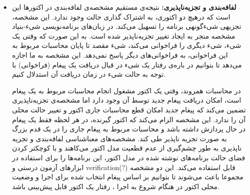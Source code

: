 \begin{itemize}
\item \textbf{لفافه‌بندی و \gls{تجزیه‌ناپذیر}ی:}  
نتیجه‌ی مستقیم مشخصه‌ی لفافه‌بندی در اکتور‌ها این است که درهیچ دو اکتوری، به اشتراک گذاری حالت وجود ندارد. این مشخصه، \gls{تجزیه}ی \gls{شیءگونه}ی برنامه را تسهیل می‌کند. در زبان‌های برنامه‌نویسی \gls{شیء-بنیاد} مشخصه منجر به ایجاد تغییر تجزیه‌ناپذیر شده است. به این صورت که وقتی یک شیء، شیء دیگری را فراخوانی می‌کند، شیء مقصد تا پایان محاسبات مربوط به این فراخوانی، به فراخوانی‌های دیگر پاسخ نمی‌دهد.  این مشخصه به ما اجازه می‌دهد تا بتوانیم در باره‌ی رفتار یک شیء در قبال دریافت یک پیغام (فراخوانی) با توجه به حالت شیء در زمان دریافت آن \gls{استدلال} کنیم.

در محاسبات همروند، وقتی یک اکتور مشغول انجام محاسبات مربوط به یک پیغام است، امکان دریافت پیغام جدید توسط آن وجود دارد اما مشخصه‌ی تجزیه‌ناپذیری تضمین می‌کند که پیغام جدید امکان قطع محاسبات جاری اکتور و تغییر حالت محلی آن را ندارد. این مشخصه الزام می‌کند که اکتور گیرنده، در هر لحظه فقط یک پیغام در حال پردازش داشته باشد و محاسبات مربوط به  پیغام جاری را در یک قدم بزرگ به صورت تجزیه ناپذیر طی کند. \cite{AghaMST97}
مشخصه‌های معناشناسی لفافه‌بندی و تجزیه ناپذیری به طور  چشم‌گیری از عدم قطعیت مدل اکتور می‌کاهند و با کوچکتر کردن فضای حالت برنامه‌های نوشته شده در مدل اکتور، این برنامه‌ها را برای استفاده در ابزارهای آزمون درستی و  verification(?) قابل استفاده می‌کند\cite{LauterburgKMA10}.
این دو مشخصه مجموعا باعث می‌شوند تا بتوانیم بر اساس پیغام انتخاب شده برای اجرا و وضعیت محلی اکتور در هنگام شروع به اجرا ، رفتار یک اکتور قابل پیش‌بینی باشد.


\end{itemize}
